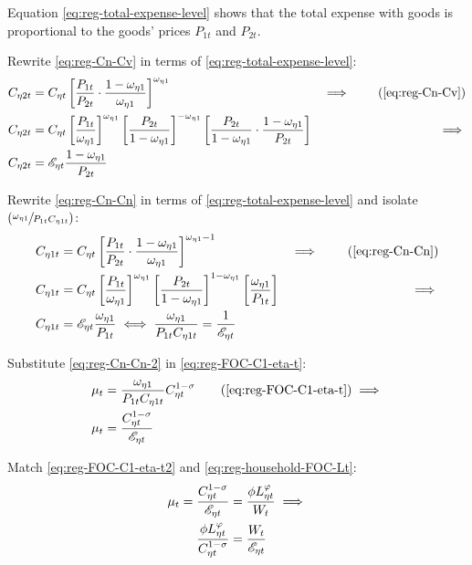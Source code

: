 \documentclass[
thesis.tex
]{subfiles}
\begin{document}
Equation \ref{eq:reg-total-expense-level} shows that the total expense with goods is proportional to the goods' prices $P_{1 t}$ and $P_{2 t}$.

Rewrite \ref{eq:reg-Cn-Cv} in terms of \ref{eq:reg-total-expense-level}:
\begin{alignat}{2}
	C_{\eta 2 t} &= C_{\eta t} \left[ \frac{P_{1 t}}{P_{2 t}} \cdot \frac{1 -\omega_{\eta 1}}{\omega_{\eta 1}} \right]^{\omega_{\eta 1}} &\implies \tag{\ref{eq:reg-Cn-Cv}} \\
	C_{\eta 2 t} &= C_{\eta t} \left[ \frac{P_{1 t}}{\omega_{\eta 1}} \right]^{\omega_{\eta 1}} \left[ \frac{P_{2 t}}{1 -\omega_{\eta 1}} \right]^{-\omega_{\eta 1}} \left[ \frac{P_{2 t}}{1 -\omega_{\eta 1}} \cdot \frac{1 -\omega_{\eta 1}}{P_{2 t}} \right] &\implies \nonumber \\
	C_{\eta 2 t} &= \te \frac{1 -\omega_{\eta 1}}{P_{2 t}} \label{eq:reg-Cn-Cv-2}
\end{alignat}

Rewrite \ref{eq:reg-Cn-Cn} in terms of \ref{eq:reg-total-expense-level} and isolate $(\sfrac{\omega_{\eta 1}}{P_{1 t} C_{\eta 1 t}})$:
	\begin{alignat}{2}
		C_{\eta 1 t} &= C_{\eta t} \left[ \frac{P_{1 t}}{P_{2 t}} \cdot \frac{1 -\omega_{\eta 1}}{\omega_{\eta 1}} \right]^{\omega_{\eta 1} -1} &\implies \tag{\ref{eq:reg-Cn-Cn}} \\
		C_{\eta 1 t} &= C_{\eta t} \left[ \frac{ P_{1 t}}{ \omega_{\eta 1}}\right]^{ \omega_{\eta 1}} \left[ \frac{P_{2 t}}{1-\omega_{\eta 1}} \right]^{1 -\omega_{\eta 1}} \left[ \frac{\omega_{\eta 1}}{P_{1 t}} \right] &\implies \nonumber \\
		C_{\eta 1 t} &= \te \frac{\omega_{\eta 1}}{P_{1 t}} \iff
		\frac{\omega_{\eta 1}}{P_{1 t} C_{\eta 1 t}} = \frac{1}{\te} \label{eq:reg-Cn-Cn-2}
	\end{alignat}

Substitute \ref{eq:reg-Cn-Cn-2} in \ref{eq:reg-FOC-C1-eta-t}:
\begin{align}
	\mu_t &= \frac{\omega_{\eta 1}}{P_{1 t} C_{\eta 1 t}} C_{\eta t}^{1 -\sigma} \tag{\ref{eq:reg-FOC-C1-eta-t}} \implies \\
	\mu_t &= \frac{ C_{\eta t}^{1-\sigma}}{ \te}  \label{eq:reg-FOC-C1-eta-t2}
\end{align}

Match \ref{eq:reg-FOC-C1-eta-t2} and \ref{eq:reg-household-FOC-Lt}:
\begin{align}
	\mu_t = \frac{ C_{\eta t}^{1-\sigma}}{ {\mathscr{E}_{\eta t}}} &= \frac{\phi L_{\eta t}^{\varphi}}{W_t} \implies \nonumber \\
	\frac{\phi L_{\eta t}^{\varphi}}{C_{\eta t}^{1-\sigma}} &= \frac{W_t}{{\mathscr{E}_{\eta t}}} \label{eq:reg-labor-supply}
\end{align}
\end{document}
